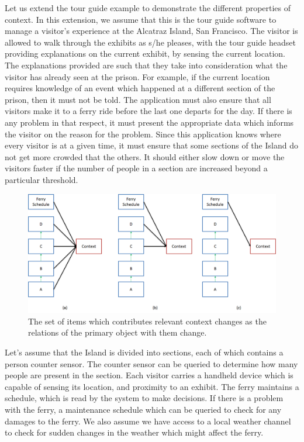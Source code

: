 Let us extend the tour guide example to demonstrate the different properties of context. In this extension, we assume that this is the tour guide software to manage a visitor's experience at the Alcatraz Island, San Francisco. The visitor is allowed to walk through the exhibits as s/he pleases, with the tour guide headset providing explanations on the current exhibit, by sensing the current location. The explanations provided are such that they take into consideration what the visitor has already seen at the prison. For example, if the current location requires knowledge of an event which happened at a different section of the prison, then it must not be told. The application must also ensure that all visitors make it to a ferry ride before the last one departs for the day. If there is any problem in that respect, it must present the appropriate data which informs the visitor on the reason for the problem. Since this application knows where every visitor is at a given time, it must ensure that some sections of the Island do not get more crowded that the others. It should either slow down or move the visitors faster if the number of people in a section are increased beyond a particular threshold.

\begin{figure}[t]
\centering
\includegraphics[width=\textwidth]{media/chapter2/changes.png}
\caption{The set of items which contributes relevant context changes as the relations of the primary object with them change.}
\label{fig:turkey}
\end{figure}

Let's assume that the Island is divided into sections, each of which contains a person counter sensor. The counter sensor can be queried to determine how many people are present in the section. Each visitor carries a handheld device which is capable of sensing its location, and proximity to an exhibit. The ferry maintains a schedule, which is read by the system to make decisions. If there is a problem with the ferry, a maintenance schedule which can be queried to check for any damages to the ferry. We also assume we have access to a local weather channel to check for sudden changes in the weather which might affect the ferry.

